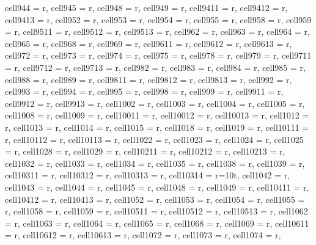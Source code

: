 \begin{landscape}
\begin{longtblr}[
  caption = {Changes in average values and effects differences significance from post hoc analysis.},
  label = {tab:appendix_LCBM_all_results_post_hocs}
]
{  cell{94}{4} = {r},
  cell{94}{5} = {r},
  cell{94}{8} = {r},
  cell{94}{9} = {r},
  cell{94}{11} = {r},
  cell{94}{12} = {r},
  cell{94}{13} = {r},
  cell{95}{2} = {r},
  cell{95}{3} = {r},
  cell{95}{4} = {r},
  cell{95}{5} = {r},
  cell{95}{8} = {r},
  cell{95}{9} = {r},
  cell{95}{11} = {r},
  cell{95}{12} = {r},
  cell{95}{13} = {r},
  cell{96}{2} = {r},
  cell{96}{3} = {r},
  cell{96}{4} = {r},
  cell{96}{5} = {r},
  cell{96}{8} = {r},
  cell{96}{9} = {r},
  cell{96}{11} = {r},
  cell{96}{12} = {r},
  cell{96}{13} = {r},
  cell{97}{2} = {r},
  cell{97}{3} = {r},
  cell{97}{4} = {r},
  cell{97}{5} = {r},
  cell{97}{8} = {r},
  cell{97}{9} = {r},
  cell{97}{11} = {r},
  cell{97}{12} = {r},
  cell{97}{13} = {r},
  cell{98}{2} = {r},
  cell{98}{3} = {r},
  cell{98}{4} = {r},
  cell{98}{5} = {r},
  cell{98}{8} = {r},
  cell{98}{9} = {r},
  cell{98}{11} = {r},
  cell{98}{12} = {r},
  cell{98}{13} = {r},
  cell{99}{2} = {r},
  cell{99}{3} = {r},
  cell{99}{4} = {r},
  cell{99}{5} = {r},
  cell{99}{8} = {r},
  cell{99}{9} = {r},
  cell{99}{11} = {r},
  cell{99}{12} = {r},
  cell{99}{13} = {r},
  cell{100}{2} = {r},
  cell{100}{3} = {r},
  cell{100}{4} = {r},
  cell{100}{5} = {r},
  cell{100}{8} = {r},
  cell{100}{9} = {r},
  cell{100}{11} = {r},
  cell{100}{12} = {r},
  cell{100}{13} = {r},
  cell{101}{2} = {r},
  cell{101}{3} = {r},
  cell{101}{4} = {r},
  cell{101}{5} = {r},
  cell{101}{8} = {r},
  cell{101}{9} = {r},
  cell{101}{11} = {r},
  cell{101}{12} = {r},
  cell{101}{13} = {r},
  cell{102}{2} = {r},
  cell{102}{3} = {r},
  cell{102}{4} = {r},
  cell{102}{5} = {r},
  cell{102}{8} = {r},
  cell{102}{9} = {r},
  cell{102}{11} = {r},
  cell{102}{12} = {r},
  cell{102}{13} = {r},
  cell{103}{2} = {r},
  cell{103}{3} = {r},
  cell{103}{4} = {r},
  cell{103}{5} = {r},
  cell{103}{8} = {r},
  cell{103}{9} = {r},
  cell{103}{11} = {r},
  cell{103}{12} = {r},
  cell{103}{13} = {r},
  cell{103}{14} = {r=10}{t},
  cell{104}{2} = {r},
  cell{104}{3} = {r},
  cell{104}{4} = {r},
  cell{104}{5} = {r},
  cell{104}{8} = {r},
  cell{104}{9} = {r},
  cell{104}{11} = {r},
  cell{104}{12} = {r},
  cell{104}{13} = {r},
  cell{105}{2} = {r},
  cell{105}{3} = {r},
  cell{105}{4} = {r},
  cell{105}{5} = {r},
  cell{105}{8} = {r},
  cell{105}{9} = {r},
  cell{105}{11} = {r},
  cell{105}{12} = {r},
  cell{105}{13} = {r},
  cell{106}{2} = {r},
  cell{106}{3} = {r},
  cell{106}{4} = {r},
  cell{106}{5} = {r},
  cell{106}{8} = {r},
  cell{106}{9} = {r},
  cell{106}{11} = {r},
  cell{106}{12} = {r},
  cell{106}{13} = {r},
  cell{107}{2} = {r},
  cell{107}{3} = {r},
  cell{107}{4} = {r},
}
\end{longtblr}
\end{landscape}
